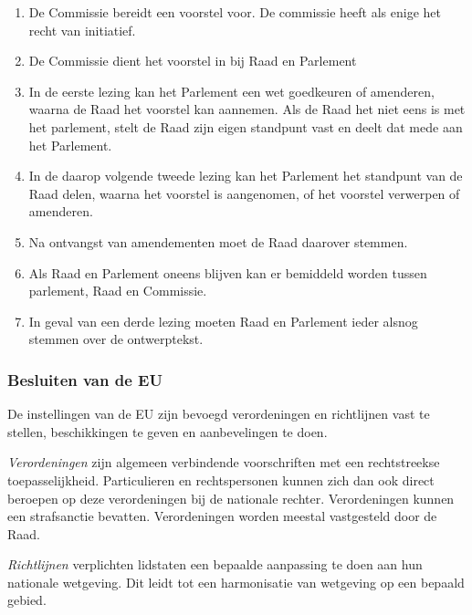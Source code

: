 \documentclass{article}
\begin{document}
\begin{enumerate}

  \item De Commissie bereidt een voorstel voor. De commissie heeft als enige
    het recht van initiatief.

  \item De Commissie dient het voorstel in bij Raad en Parlement

  \item In de eerste lezing kan het Parlement een wet goedkeuren of amenderen,
    waarna de Raad het voorstel kan aannemen. Als de Raad het niet eens is met
    het parlement, stelt de Raad zijn eigen standpunt vast en deelt dat mede
    aan het Parlement.

  \item In de daarop volgende tweede lezing kan het Parlement het standpunt van
    de Raad delen, waarna het voorstel is aangenomen, of het voorstel verwerpen
    of amenderen.

  \item Na ontvangst van amendementen moet de Raad daarover stemmen.

  \item Als Raad en Parlement oneens blijven kan er bemiddeld worden tussen
    parlement, Raad en Commissie.

  \item In geval van een derde lezing moeten Raad en Parlement ieder alsnog
    stemmen over de ontwerptekst.

\end{enumerate}

\subsubsection{Besluiten van de EU}

De instellingen van de EU zijn bevoegd verordeningen en richtlijnen vast te
stellen, beschikkingen te geven en aanbevelingen te doen.

\emph{Verordeningen} zijn algemeen verbindende voorschriften met een
rechtstreekse toepasselijkheid. Particulieren en rechtspersonen kunnen zich dan
ook direct beroepen op deze verordeningen bij de nationale rechter.
Verordeningen kunnen een strafsanctie bevatten. Verordeningen worden meestal
vastgesteld door de Raad.

\emph{Richtlijnen} verplichten lidstaten een bepaalde aanpassing te doen aan
hun nationale wetgeving. Dit leidt tot een harmonisatie van wetgeving op een
bepaald gebied.
\end{document}
